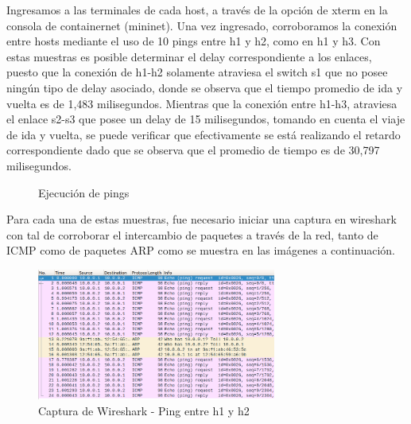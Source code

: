 \documentclass[10pt]{article}
\begin{document}
\noindent
Ingresamos a las terminales de cada host, a través de la opción de xterm en la consola de containernet (mininet). Una vez ingresado, corroboramos la conexión entre hosts mediante el uso de 10 pings entre h1 y h2, como en h1 y h3. Con estas muestras es posible determinar el delay correspondiente a los enlaces, puesto que la conexión de h1-h2 solamente atraviesa el switch s1 que no posee ningún tipo de delay asociado, donde se observa que el tiempo promedio de ida y vuelta es de 1,483 milisegundos. Mientras que la conexión entre h1-h3, atraviesa el enlace s2-s3 que posee un delay de 15 milisegundos, tomando en cuenta el viaje de ida y vuelta, se puede verificar que efectivamente se está realizando el retardo correspondiente dado que se observa que el promedio de tiempo es de 30,797 milisegundos.\newline

\begin{figure}[H]
\centering
{}
\caption{Ejecución de pings}
\label{fig:item01pinghost}
\end{figure}

\noindent
Para cada una de estas muestras, fue necesario iniciar una captura en wireshark con tal de corroborar el intercambio de paquetes a través de la red, tanto de ICMP como de paquetes ARP como se muestra en las imágenes a continuación.

\begin{figure}[H]
    \centering
    \includegraphics[width=0.7\textwidth]{Imagenes/item01_ping_h1-h2_Wireshark.png}
    \caption{Captura de Wireshark - Ping entre h1 y h2}
    \label{fig:item01_h1_h2_Wire}
\end{figure}
\end{document}

